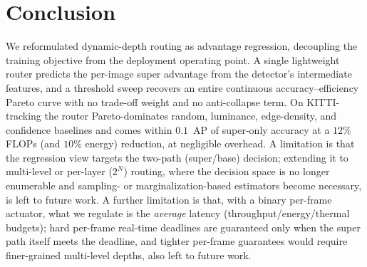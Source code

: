 \section{Conclusion}
\label{sec:conclusion}

We reformulated dynamic-depth routing as advantage regression, decoupling the
training objective from the deployment operating point. A single lightweight router
predicts the per-image super advantage from the detector's intermediate features, and a
threshold sweep recovers an entire continuous accuracy--efficiency Pareto curve with
no trade-off weight and no anti-collapse term. On KITTI-tracking the router
Pareto-dominates random, luminance, edge-density, and confidence baselines and
comes within $0.1$~AP of super-only accuracy at a $12\%$ FLOPs (and $10\%$ energy)
reduction, at negligible overhead. A limitation is that the regression view targets the two-path
(super/base) decision; extending it to multi-level or per-layer ($2^N$) routing,
where the decision space is no longer enumerable and sampling- or
marginalization-based estimators become necessary, is left to future work.
A further limitation is that, with a binary per-frame actuator, what we regulate is
the \emph{average} latency (throughput/energy/thermal budgets); hard per-frame
real-time deadlines are guaranteed only when the super path itself meets the
deadline, and tighter per-frame guarantees would require finer-grained multi-level
depths, also left to future work.
